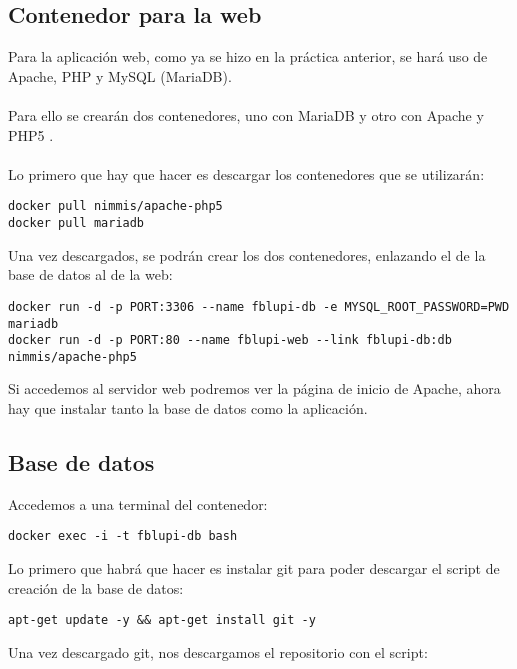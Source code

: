 \label{sec:conexion}
\subsection{Contenedor para la web}

Para la aplicación web, como ya se hizo en la práctica anterior, se hará uso de Apache, PHP y MySQL (MariaDB).
\\ \\
Para ello se crearán dos contenedores, uno con MariaDB y otro con Apache y PHP5 \cite{DockerPHPMySQL} \cite{DockerMariaDB}.
\\ \\
Lo primero que hay que hacer es descargar los contenedores que se utilizarán:

\begin{lstlisting}
docker pull nimmis/apache-php5
docker pull mariadb
\end{lstlisting}

Una vez descargados, se podrán crear los dos contenedores, enlazando el de la base de datos al de la web:

\begin{lstlisting}
docker run -d -p PORT:3306 --name fblupi-db -e MYSQL_ROOT_PASSWORD=PWD mariadb
docker run -d -p PORT:80 --name fblupi-web --link fblupi-db:db nimmis/apache-php5 
\end{lstlisting}

Si accedemos al servidor web podremos ver la página de inicio de Apache, ahora hay que instalar tanto la base de datos como la aplicación.

\subsection{Base de datos}

Accedemos a una terminal del contenedor:

\begin{lstlisting}
docker exec -i -t fblupi-db bash
\end{lstlisting}

Lo primero que habrá que hacer es instalar git para poder descargar el script de creación de la base de datos:

\begin{lstlisting}
apt-get update -y && apt-get install git -y
\end{lstlisting}

Una vez descargado git, nos descargamos el repositorio con el script:

